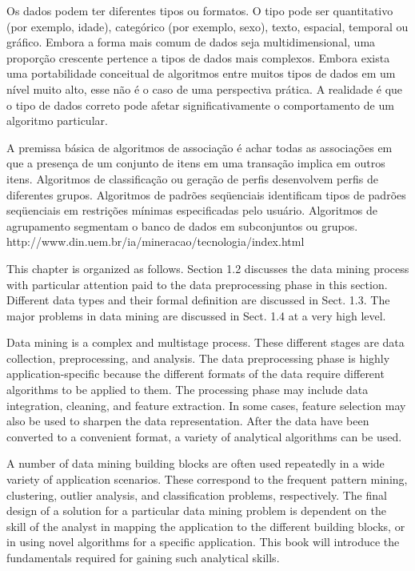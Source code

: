Os dados podem ter diferentes tipos ou formatos. O tipo pode ser quantitativo (por exemplo, idade), categórico (por exemplo, sexo), texto, espacial, temporal ou gráfico. Embora a forma mais comum de dados seja multidimensional, uma proporção crescente pertence a tipos de dados mais complexos. Embora exista uma portabilidade conceitual de algoritmos entre muitos tipos de dados em um nível muito alto, esse não é o caso de uma perspectiva prática. A realidade é que o tipo de dados correto pode afetar significativamente o comportamento de um algoritmo particular.





A premissa básica de algoritmos de associação é achar todas as associações em que a presença de um conjunto de itens em uma transação implica em outros itens. Algoritmos de classificação ou geração de perfis desenvolvem perfis de diferentes grupos. Algoritmos de padrões seqüenciais identificam tipos de padrões seqüenciais em restrições mínimas especificadas pelo usuário. Algoritmos de agrupamento segmentam o banco de dados em subconjuntos ou grupos.
http://www.din.uem.br/ia/mineracao/tecnologia/index.html



This chapter is organized as follows. Section 1.2 discusses the data mining process with particular attention paid to the data preprocessing phase in this section. Different data types and their formal definition are discussed in Sect. 1.3. The major problems in data mining are discussed in Sect. 1.4 at a very high level.

Data mining is a complex and multistage process. These different stages are data collection, preprocessing, and analysis. The data preprocessing phase is highly application-specific because the different formats of the data require different algorithms to be applied to them. The processing phase may include data integration, cleaning, and feature extraction. In some cases, feature selection may also be used to sharpen the data representation. After the data have been converted to a convenient format, a variety of analytical algorithms can be used.

A number of data mining building blocks are often used repeatedly in a wide variety of application scenarios. These correspond to the frequent pattern mining, clustering, outlier analysis, and classification problems, respectively. The final design of a solution for a particular data mining problem is dependent on the skill of the analyst in mapping the application to the different building blocks, or in using novel algorithms for a specific application. This book will introduce the fundamentals required for gaining such analytical skills.

